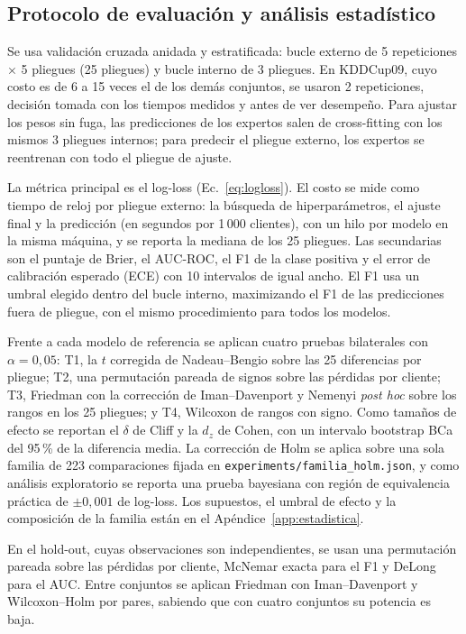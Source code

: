 \documentclass[11pt,a4paper]{article}
\begin{document}
\subsection{Protocolo de evaluación y análisis estadístico}\label{sec:protocolo}
Se usa validación cruzada anidada y estratificada: bucle externo de 5 repeticiones $\times$ 5 pliegues (25 pliegues) y bucle interno de 3 pliegues. En KDDCup09, cuyo costo es de 6 a 15 veces el de los demás conjuntos, se usaron 2 repeticiones, decisión tomada con los tiempos medidos y antes de ver desempeño. Para ajustar los pesos sin fuga, las predicciones de los expertos salen de cross-fitting con los mismos 3 pliegues internos; para predecir el pliegue externo, los expertos se reentrenan con todo el pliegue de ajuste.

La métrica principal es el log-loss (Ec.~\ref{eq:logloss}). El costo se mide como tiempo de reloj por pliegue externo: la búsqueda de hiperparámetros, el ajuste final y la predicción (en segundos por 1\,000 clientes), con un hilo por modelo en la misma máquina, y se reporta la mediana de los 25 pliegues. Las secundarias son el puntaje de Brier, el AUC-ROC, el F1 de la clase positiva y el error de calibración esperado (ECE) con 10 intervalos de igual ancho. El F1 usa un umbral elegido dentro del bucle interno, maximizando el F1 de las predicciones fuera de pliegue, con el mismo procedimiento para todos los modelos.

Frente a cada modelo de referencia se aplican cuatro pruebas bilaterales con $\alpha=0{,}05$: T1, la $t$ corregida de Nadeau--Bengio \cite{nadeau2003} sobre las 25 diferencias por pliegue; T2, una permutación pareada de signos sobre las pérdidas por cliente; T3, Friedman con la corrección de Iman--Davenport y Nemenyi \emph{post hoc} \cite{demsar2006} sobre los rangos en los 25 pliegues; y T4, Wilcoxon de rangos con signo. Como tamaños de efecto se reportan el $\delta$ de Cliff y la $d_z$ de Cohen, con un intervalo bootstrap BCa del 95\,\% de la diferencia media. La corrección de Holm \cite{holm1979} se aplica sobre una sola familia de 223 comparaciones fijada en \texttt{experiments/familia\_holm.json}, y como análisis exploratorio se reporta una prueba bayesiana con región de equivalencia práctica de $\pm0{,}001$ de log-loss. Los supuestos, el umbral de efecto y la composición de la familia están en el Apéndice~\ref{app:estadistica}.

En el hold-out, cuyas observaciones son independientes, se usan una permutación pareada sobre las pérdidas por cliente, McNemar exacta para el F1 y DeLong para el AUC. Entre conjuntos se aplican Friedman con Iman--Davenport y Wilcoxon--Holm por pares, sabiendo que con cuatro conjuntos su potencia es baja.
\end{document}
